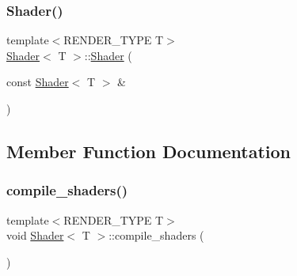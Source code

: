 \mbox{\label{classShader_a49b2a448a00b5e1413c17501f8873cca}} 
\subsubsection{\texorpdfstring{Shader()}{Shader()}\hspace{0.1cm}{\footnotesize\ttfamily [3/3]}}
{\footnotesize\ttfamily template$<$R\+E\+N\+D\+E\+R\+\_\+\+T\+Y\+PE T$>$ \\
\mbox{\hyperlink{classShader}{Shader}}$<$ T $>$\+::\mbox{\hyperlink{classShader}{Shader}} (\begin{DoxyParamCaption}\item[{const \mbox{\hyperlink{classShader}{Shader}}$<$ T $>$ \&}]{ }\end{DoxyParamCaption})\hspace{0.3cm}{\ttfamily [delete]}}



\subsection{Member Function Documentation}
\mbox{\label{classShader_a1176d69a08aef6df3b7850104871a839}} 
\subsubsection{\texorpdfstring{compile\+\_\+shaders()}{compile\_shaders()}\hspace{0.1cm}{\footnotesize\ttfamily [1/3]}}
{\footnotesize\ttfamily template$<$R\+E\+N\+D\+E\+R\+\_\+\+T\+Y\+PE T$>$ \\
void \mbox{\hyperlink{classShader}{Shader}}$<$ T $>$\+::compile\+\_\+shaders (\begin{DoxyParamCaption}{ }\end{DoxyParamCaption})\hspace{0.3cm}{\ttfamily [protected]}}

\mbox{\label{classShader_a3ffd553eceda4e9d5a1d8b4a5a157659}} 
